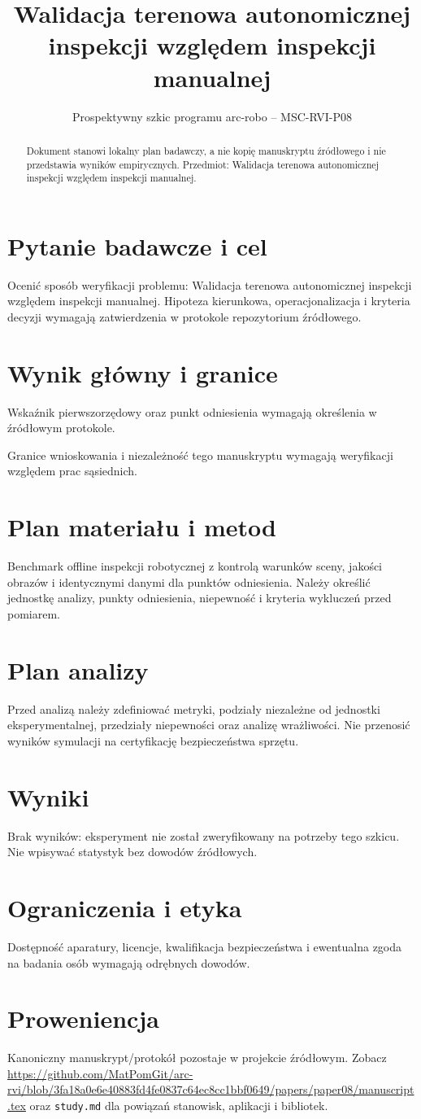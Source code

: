 \documentclass[11pt,a4paper]{article}
\title{Walidacja terenowa autonomicznej inspekcji względem inspekcji manualnej}
\author{}
\date{Prospektywny szkic programu arc-robo -- MSC-RVI-P08}
\begin{document}
\maketitle
\begin{abstract}
Dokument stanowi lokalny plan badawczy, a nie kopię manuskryptu źródłowego i nie przedstawia wyników empirycznych. Przedmiot: Walidacja terenowa autonomicznej inspekcji względem inspekcji manualnej.
\end{abstract}
\section{Pytanie badawcze i cel}
Ocenić sposób weryfikacji problemu: Walidacja terenowa autonomicznej inspekcji względem inspekcji manualnej. Hipoteza kierunkowa, operacjonalizacja i kryteria decyzji wymagają zatwierdzenia w protokole repozytorium źródłowego.
\section{Wynik główny i granice}
Wskaźnik pierwszorzędowy oraz punkt odniesienia wymagają określenia w źródłowym protokole.

Granice wnioskowania i niezależność tego manuskryptu wymagają weryfikacji względem prac sąsiednich.
\section{Plan materiału i metod}
Benchmark offline inspekcji robotycznej z kontrolą warunków sceny, jakości obrazów i identycznymi danymi dla punktów odniesienia. Należy określić jednostkę analizy, punkty odniesienia, niepewność i kryteria wykluczeń przed pomiarem.
\section{Plan analizy}
Przed analizą należy zdefiniować metryki, podziały niezależne od jednostki eksperymentalnej, przedziały niepewności oraz analizę wrażliwości. Nie przenosić wyników symulacji na certyfikację bezpieczeństwa sprzętu.
\section{Wyniki}
Brak wyników: eksperyment nie został zweryfikowany na potrzeby tego szkicu. Nie wpisywać statystyk bez dowodów źródłowych.
\section{Ograniczenia i etyka}
Dostępność aparatury, licencje, kwalifikacja bezpieczeństwa i ewentualna zgoda na badania osób wymagają odrębnych dowodów.
\section{Proweniencja}
Kanoniczny manuskrypt/protokół pozostaje w projekcie źródłowym. Zobacz \url{https://github.com/MatPomGit/arc-rvi/blob/3fa18a0e6e40883fd4fe0837c64ec8cc1bbf0649/papers/paper08/manuscript.tex} oraz \texttt{study.md} dla powiązań stanowisk, aplikacji i bibliotek.
\end{document}
